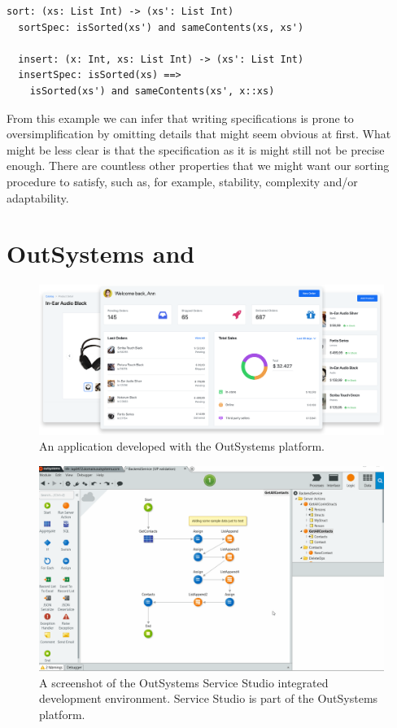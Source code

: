 \begin{lstlisting}[xleftmargin=.2\textwidth]
  sort: (xs: List Int) -> (xs': List Int)
  sortSpec: isSorted(xs') and sameContents(xs, xs')

  insert: (x: Int, xs: List Int) -> (xs': List Int)
  insertSpec: isSorted(xs) ==>
    isSorted(xs') and sameContents(xs', x::xs)
\end{lstlisting}

From this example we can infer that writing specifications is prone to
oversimplification by omitting details that might seem obvious at first.
What might be less clear is that the specification as it is might still not be
precise enough.
There are countless other properties that we might want our sorting procedure to
satisfy, such as, for example, stability, complexity and/or adaptability.

\section{OutSystems and }
\label{sec:outsystems-pbe}

\begin{figure}
  \centering
  \includegraphics[width=1.0\textwidth]{assets/outsystems-app.png}
  \caption{An application developed with the OutSystems platform.}
  \label{fig:outsystems-app}
\end{figure}

\begin{figure}
  \centering
  \includegraphics[width=1.0\textwidth]{assets/outsystems-studio.png}
  \caption{A screenshot of the OutSystems Service Studio integrated development
    environment. Service Studio is part of the OutSystems platform.}
  \label{fig:outsystems-platform}
\end{figure}

